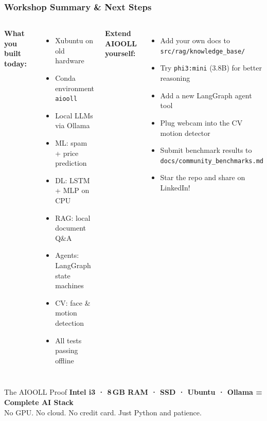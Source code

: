 \begin{frame}[fragile]\frametitle{Workshop Summary \& Next Steps}
\begin{columns}
\textbf{What you built today:}
\begin{itemize}
  \item[$\checkmark$] Xubuntu on old hardware
  \item[$\checkmark$] Conda environment \texttt{aiooll}
  \item[$\checkmark$] Local LLMs via Ollama
  \item[$\checkmark$] ML: spam + price prediction
  \item[$\checkmark$] DL: LSTM + MLP on CPU
  \item[$\checkmark$] RAG: local document Q\&A
  \item[$\checkmark$] Agents: LangGraph state machines
  \item[$\checkmark$] CV: face \& motion detection
  \item[$\checkmark$] All tests passing offline
\end{itemize}
\textbf{Extend AIOOLL yourself:}
\begin{itemize}
  \item Add your own docs to \texttt{src/rag/knowledge\_base/}
  \item Try \texttt{phi3:mini} (3.8B) for better reasoning
  \item Add a new LangGraph agent tool
  \item Plug webcam into the CV motion detector
  \item Submit benchmark results to \texttt{docs/community\_benchmarks.md}
  \item Star the repo and share on LinkedIn!
\end{itemize}
\end{columns}
\vspace{0.5em}
\begin{block}{The AIOOLL Proof}
\centering
\textbf{Intel i3 · 8\,GB RAM · SSD · Ubuntu · Ollama = Complete AI Stack}\\
No GPU. No cloud. No credit card. Just Python and patience.
\end{block}
\end{frame}


